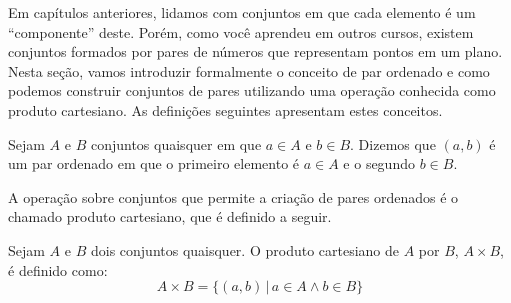 Em capítulos anteriores, lidamos com conjuntos em que cada elemento é
um ``componente'' deste. Porém, como você aprendeu em outros cursos,
existem conjuntos formados por pares de números que representam pontos
em um plano. Nesta seção, vamos introduzir formalmente o conceito de
par ordenado e como podemos construir conjuntos de pares utilizando
uma operação conhecida como produto cartesiano. As definições
seguintes apresentam estes conceitos.

\begin{Definition}
Sejam $A$ e $B$ conjuntos quaisquer em que $a \in A$ e $b \in
B$. Dizemos que $(a,b)$ é um par ordenado em que o primeiro elemento é
$a \in A$ e o segundo $b\in B$.
\end{Definition}

A operação sobre conjuntos que permite a criação de pares ordenados é
o chamado produto cartesiano, que é definido a seguir.

\begin{Definition}
Sejam  $A$ e $B$ dois conjuntos quaisquer. O produto cartesiano de $A$
por $B$, $A\times B$, é definido como:
\[
A\times B = \{(a,b)\,|\,a \in A \land b\in B\}
\]
\end{Definition}

